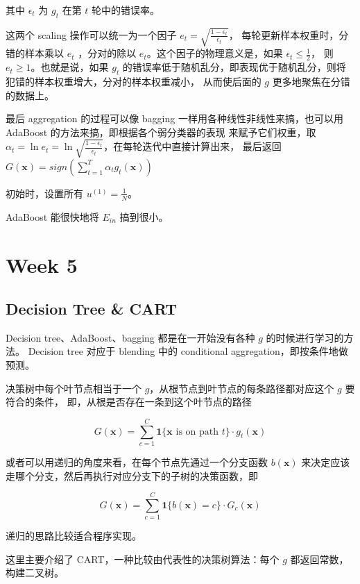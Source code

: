 \documentclass[a4paper]{article}
\begin{document}
其中 $\epsilon_t$ 为 $g_t$ 在第 $t$ 轮中的错误率。

这两个 scaling 操作可以统一为一个因子 $\displaystyle e_t = \sqrt{\frac{1 - \epsilon_t}{\epsilon_t}}$，
每轮更新样本权重时，分错的样本乘以 $e_t$ ，分对的除以 $e_t$。这个因子的物理意义是，如果 $\displaystyle \epsilon_t \le \frac{1}{2}$，
则 $e_t \ge 1$。也就是说，如果 $g_t$ 的错误率低于随机乱分，即表现优于随机乱分，则将犯错的样本权重增大，分对的样本权重减小，
从而使后面的 $g$ 更多地聚焦在分错的数据上。

最后 aggregation 的过程可以像 bagging 一样用各种线性非线性来搞，也可以用 AdaBoost 的方法来搞，即根据各个弱分类器的表现
来赋予它们权重，取 $\displaystyle \alpha_t = \ln e_t = \ln\sqrt{\frac{1 - \epsilon_t}{\epsilon_t}}$，在每轮迭代中直接计算出来，
最后返回 $G(\mathbf{x}) = sign(\sum_{t=1}^{T}\alpha_t g_t(\mathbf{x}))$

初始时，设置所有 $\displaystyle u^{(1)} = \frac{1}{N}$。

AdaBoost 能很快地将 $E_{in}$ 搞到很小。



\section{Week 5}
\subsection{Decision Tree \& CART}
Decision tree、AdaBoost、bagging 都是在一开始没有各种 $g$ 的时候进行学习的方法。
Decision tree 对应于 blending 中的 conditional aggregation，即按条件地做预测。

决策树中每个叶节点相当于一个 $g$，从根节点到叶节点的每条路径都对应这个 $g$ 要符合的条件，
即，从根是否存在一条到这个叶节点的路径

$$G(\mathbf{x}) = \sum_{c=1}^{C}\mathbf{1}\{\mathbf{x}\text{ is on path }t\} \cdot g_t(\mathbf{x})$$

或者可以用递归的角度来看，在每个节点先通过一个分支函数 $b(\mathbf{x})$ 来决定应该
走哪个分支，然后再执行对应分支下的子树的决策函数，即

$$G(\mathbf{x}) = \sum_{c=1}^{C}\mathbf{1}\{b(\mathbf{x}) = c\} \cdot G_c(\mathbf{x})$$

递归的思路比较适合程序实现。

这里主要介绍了 CART，一种比较由代表性的决策树算法：每个 $g$ 都返回常数，构建二叉树。
\end{document}

